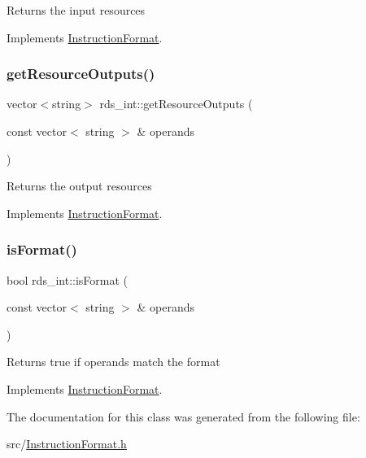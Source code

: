 Returns the input resources 

Implements \hyperlink{classInstructionFormat_a09775d3a3c22f40a0f44504664e586e4}{Instruction\+Format}.

\mbox{\label{classrds__int_acbcdd1ee4ccce4fab70fc88878b89eb4}} 
\subsubsection{\texorpdfstring{get\+Resource\+Outputs()}{getResourceOutputs()}}
{\footnotesize\ttfamily vector$<$string$>$ rds\+\_\+int\+::get\+Resource\+Outputs (\begin{DoxyParamCaption}\item[{const vector$<$ string $>$ \&}]{operands }\end{DoxyParamCaption})\hspace{0.3cm}{\ttfamily [virtual]}}

Returns the output resources 

Implements \hyperlink{classInstructionFormat_a95cd28ffb1bde59b67f676880ab10536}{Instruction\+Format}.

\mbox{\label{classrds__int_ac34d1eca9d3ada3e8c2d2b063216d955}} 
\subsubsection{\texorpdfstring{is\+Format()}{isFormat()}}
{\footnotesize\ttfamily bool rds\+\_\+int\+::is\+Format (\begin{DoxyParamCaption}\item[{const vector$<$ string $>$ \&}]{operands }\end{DoxyParamCaption})\hspace{0.3cm}{\ttfamily [virtual]}}

Returns true if operands match the format 

Implements \hyperlink{classInstructionFormat_a9fdcf94dcd7d9a55ba86e7a63f04d1fe}{Instruction\+Format}.



The documentation for this class was generated from the following file\+:\begin{DoxyCompactItemize}
\item 
src/\hyperlink{InstructionFormat_8h}{Instruction\+Format.\+h}\end{DoxyCompactItemize}
